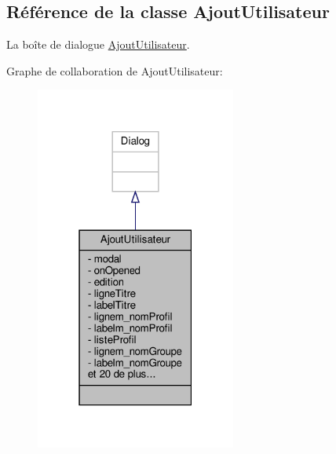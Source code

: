 \hypertarget{class_ajout_utilisateur}{}\subsection{Référence de la classe Ajout\+Utilisateur}
\label{class_ajout_utilisateur}


La boîte de dialogue \hyperlink{class_ajout_utilisateur}{Ajout\+Utilisateur}.  




Graphe de collaboration de Ajout\+Utilisateur\+:\nopagebreak
\begin{figure}[H]
\begin{center}
\leavevmode
\includegraphics[width=187pt]{class_ajout_utilisateur__coll__graph}
\end{center}
\end{figure}
